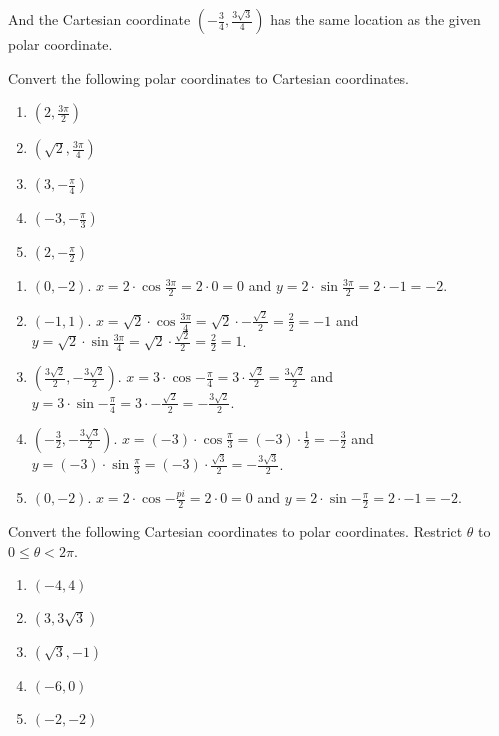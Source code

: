 And the Cartesian coordinate $(-\frac{3}{4}, \frac{3\sqrt{3}}{4})$ has the 
same location as the given polar coordinate. 

\begin{Exercise}[label = convert1]
Convert the following polar coordinates to Cartesian coordinates. 
\begin{enumerate}
\item $(2, \frac{3\pi}{2})$
\item $(\sqrt{2}, \frac{3\pi}{4})$
\item $(3, -\frac{\pi}{4})$
\item $(-3, -\frac{\pi}{3})$
\item $(2, -\frac{\pi}{2})$
\end{enumerate}
\end{Exercise}

\begin{Answer}[ref = convert1]
\begin{enumerate}
\item $(0, -2)$. $x = 2 \cdot \cos{\frac{3\pi}{2}} = 2 \cdot 0 = 0$ and $y = 2 
\cdot \sin{\frac{3\pi}{2}} = 2 \cdot -1 = -2$.
\item $(-1,1)$. $x = \sqrt{2} \cdot \cos{\frac{3\pi}{4}} = \sqrt{2} \cdot - 
\frac{\sqrt{2}}{2} = \frac{2}{2} = -1$ and $y = \sqrt{2} \cdot \sin{\frac{3
\pi}{4}} = \sqrt{2} \cdot \frac{\sqrt{2}}{2} = \frac{2}{2} = 1$. 
\item $(\frac{3\sqrt{2}}{2}, -\frac{3\sqrt{2}}{2})$. $x = 3 \cdot \cos{-\frac{
\pi}{4}} = 3 \cdot \frac{\sqrt{2}}{2} = \frac{3\sqrt{2}}{2}$ and $y = 3 \cdot 
\sin{-\frac{\pi}{4}} = 3 \cdot -\frac{\sqrt{2}}{2} = -\frac{3\sqrt{2}}{2}$.
\item $(-\frac{3}{2}, -\frac{3\sqrt{3}}{2})$. $x = (-3) \cdot \cos{\frac{\pi}{3
}} = (-3) \cdot \frac{1}{2} = -\frac{3}{2}$ and $y = (-3) \cdot \sin{\frac{\pi
}{3}} = (-3) \cdot \frac{\sqrt{3}}{2} = - \frac{3\sqrt{3}}{2}$.
\item $(0, -2)$. $x = 2 \cdot \cos{-\frac{pi}{2}} = 2 \cdot 0 = 0$ and $y = 2 
\cdot \sin{-\frac{\pi}{2}} = 2 \cdot -1 = -2$. 
\end{enumerate}
\end{Answer}

\begin{Exercise}[label = convert2]
Convert the following Cartesian coordinates to polar coordinates. Restrict 
$\theta$ to $0 \leq \theta < 2\pi$. 
\begin{enumerate}
\item $(-4, 4)$
\item $(3, 3\sqrt{3})$
\item $(\sqrt{3}, -1)$
\item $(-6, 0)$
\item $(-2, -2)$
\end{enumerate}
\end{Exercise}

